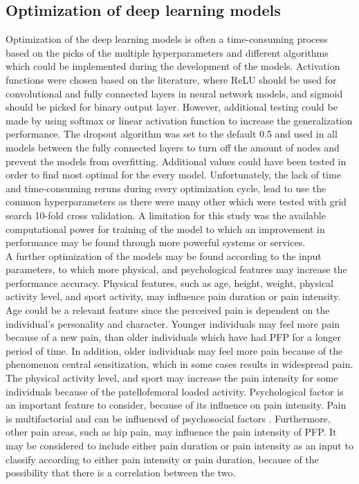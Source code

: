 \subsection*{Optimization of deep learning models}
Optimization of the deep learning models is often a time-consuming process based on the picks of the multiple hyperparameters and different algorithms which could be implemented during the development of the models.  
Activation functions were chosen based on the literature, where ReLU should be used for convolutional and fully connected layers in neural network models, and sigmoid should be picked for binary output layer. However, additional testing could be made by using softmax or linear activation function to increase the generalization performance. The dropout algorithm was set to the default 0.5 and used in all models between the fully connected layers to turn off the amount of nodes and prevent the models from overfitting. Additional values could have been tested in order to find most optimal for the every model.
Unfortunately, the lack of time and time-consuming reruns during every optimization cycle, lead to use the common hyperparameters as there were many other which were tested with grid search 10-fold cross validation.
A limitation for this study was the available computational power for training of the model to which an improvement in performance may be found through more powerful systems or services. \\
\noindent
A further optimization of the models may be found according to the input parameters, to which more physical, and psychological features may increase the performance accuracy. Physical features, such as age, height, weight, physical activity level, and sport activity, may influence pain duration or pain intensity. Age could be a relevant feature since the perceived pain is dependent on the individual's personality and character. Younger individuals may feel more pain because of a new pain, than older individuals which have had PFP for a longer period of time. In addition, older individuals may feel more pain because of the phenomenon central sensitization, which in some cases results in widespread pain. The physical activity level, and sport may increase the pain intensity for some individuals because of the patellofemoral loaded activity. Psychological factor is an important feature to consider, because of its influence on pain intensity. Pain is multifactorial and can be influenced of psychosocial factors \citep{Roos2003}. Furthermore, other pain areas, such as hip pain, may influence the pain intensity of PFP.
It may be considered to include either pain duration or pain intensity as an input to classify according to either pain intensity or pain duration, because of the possibility that there is a correlation between the two.